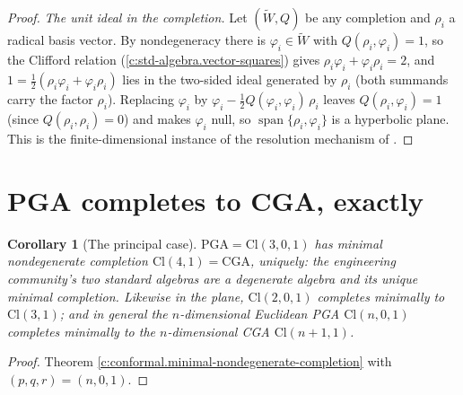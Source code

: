 \documentclass[11pt]{article}
\newtheorem{corollary}[theorem]{Corollary}
\theoremstyle{definition}
\theoremstyle{plain}
\providecommand{\Cl}{}\renewcommand{\Cl}{\mathrm{Cl}}
\begin{document}
\begin{proof}
\emph{The unit ideal in the completion.} Let $(\widetilde W, Q)$ be any completion and $\rho_i$ a radical basis vector. By nondegeneracy there is $\varphi_i \in \widetilde W$ with $Q(\rho_i, \varphi_i) = 1$, so the Clifford relation (\ref{c:std-algebra.vector-squares}) gives $\rho_i \varphi_i + \varphi_i \rho_i = 2$, and $1 = \tfrac12(\rho_i \varphi_i + \varphi_i \rho_i)$ lies in the two-sided ideal generated by $\rho_i$ (both summands carry the factor $\rho_i$). Replacing $\varphi_i$ by $\varphi_i - \tfrac12 Q(\varphi_i, \varphi_i)\, \rho_i$ leaves $Q(\rho_i, \varphi_i) = 1$ (since $Q(\rho_i, \rho_i) = 0$) and makes $\varphi_i$ null, so $\operatorname{span}\{\rho_i, \varphi_i\}$ is a hyperbolic plane. This is the finite-dimensional instance of the resolution mechanism of \cite[Prop.~3.4]{ButlerT4}.

\end{proof}

\section{PGA completes to CGA, exactly}

\begin{corollary}[The principal case]\label{c:conformal.principal-case}
$\mathrm{PGA} = \Cl(3,0,1)$ has minimal nondegenerate completion $\Cl(4,1) = \mathrm{CGA}$, uniquely: the engineering community's two standard algebras are a degenerate algebra and its unique minimal completion. Likewise in the plane, $\Cl(2,0,1)$ completes minimally to $\Cl(3,1)$; and in general the $n$-dimensional Euclidean PGA $\Cl(n,0,1)$ completes minimally to the $n$-dimensional CGA $\Cl(n{+}1,1)$.
\end{corollary}
\begin{proof}
Theorem \ref{c:conformal.minimal-nondegenerate-completion} with $(p,q,r) = (n,0,1)$.

\end{proof}
\end{document}
